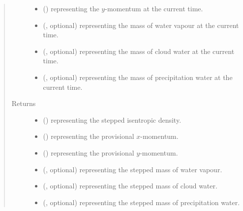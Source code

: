 \documentclass[letterpaper,10pt,english]{sphinxmanual}
\begin{document}
\begin{fulllineitems}
\begin{fulllineitems}
\begin{quote}
\begin{description}
\begin{itemize}
\item {} 
 () \textendash{}  representing the \(y\)-momentum at the current time.

\item {} 
 (, optional) \textendash{}  representing the mass of water vapour at the current time.

\item {} 
 (, optional) \textendash{}  representing the mass of cloud water at the current time.

\item {} 
 (, optional) \textendash{}  representing the mass of precipitation water at the current time.

\end{itemize}

\item[{Returns}] \leavevmode
\begin{itemize}
\item {} 
 () \textendash{}  representing the stepped isentropic density.

\item {} 
 () \textendash{}  representing the provisional \(x\)-momentum.

\item {} 
 () \textendash{}  representing the provisional \(y\)-momentum.

\item {} 
 (, optional) \textendash{}  representing the stepped mass of water vapour.

\item {} 
 (, optional) \textendash{}  representing the stepped mass of cloud water.

\item {} 
 (, optional) \textendash{}  representing the stepped mass of precipitation water.


\end{itemize}
\end{description}
\end{quote}
\end{fulllineitems}
\end{fulllineitems}
\end{document}
